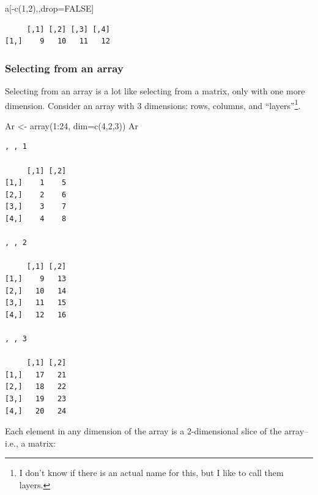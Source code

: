\documentclass[
  13,
  letterpaper,
]{report}
\newenvironment{Shaded}{\begin{snugshade}}{\end{snugshade}}
\newcommand{\AttributeTok}[1]{\textcolor[rgb]{0.40,0.45,0.13}{#1}}
\newcommand{\ConstantTok}[1]{\textcolor[rgb]{0.56,0.35,0.01}{#1}}
\newcommand{\DecValTok}[1]{\textcolor[rgb]{0.68,0.00,0.00}{#1}}
\newcommand{\FunctionTok}[1]{\textcolor[rgb]{0.28,0.35,0.67}{#1}}
\newcommand{\NormalTok}[1]{\textcolor[rgb]{0.00,0.23,0.31}{#1}}
\newcommand{\OtherTok}[1]{\textcolor[rgb]{0.00,0.23,0.31}{#1}}
\newcommand{\SpecialCharTok}[1]{\textcolor[rgb]{0.37,0.37,0.37}{#1}}
\begin{document}
\begin{Shaded}
\begin{Highlighting}[]
\NormalTok{a[}\SpecialCharTok{{-}}\FunctionTok{c}\NormalTok{(}\DecValTok{1}\NormalTok{,}\DecValTok{2}\NormalTok{),,drop}\OtherTok{=}\ConstantTok{FALSE}\NormalTok{]}
\end{Highlighting}
\end{Shaded}

\begin{verbatim}
     [,1] [,2] [,3] [,4]
[1,]    9   10   11   12
\end{verbatim}

\subsubsection{Selecting from an array}\label{sec-manip-select-bas-arr}

Selecting from an array is a lot like selecting from a matrix, only with
one more dimension. Consider an array with 3 dimensions: rows, columns,
and ``layers''\footnote{I don't know if there is an actual name for
  this, but I like to call them layers.}.

\begin{Shaded}
\begin{Highlighting}[]
\NormalTok{Ar }\OtherTok{\textless{}{-}} \FunctionTok{array}\NormalTok{(}\DecValTok{1}\SpecialCharTok{:}\DecValTok{24}\NormalTok{, }\AttributeTok{dim=}\FunctionTok{c}\NormalTok{(}\DecValTok{4}\NormalTok{,}\DecValTok{2}\NormalTok{,}\DecValTok{3}\NormalTok{))}
\NormalTok{Ar}
\end{Highlighting}
\end{Shaded}

\begin{verbatim}
, , 1

     [,1] [,2]
[1,]    1    5
[2,]    2    6
[3,]    3    7
[4,]    4    8

, , 2

     [,1] [,2]
[1,]    9   13
[2,]   10   14
[3,]   11   15
[4,]   12   16

, , 3

     [,1] [,2]
[1,]   17   21
[2,]   18   22
[3,]   19   23
[4,]   20   24
\end{verbatim}

Each element in any dimension of the array is a 2-dimensional slice of
the array--i.e., a matrix:
\end{document}
